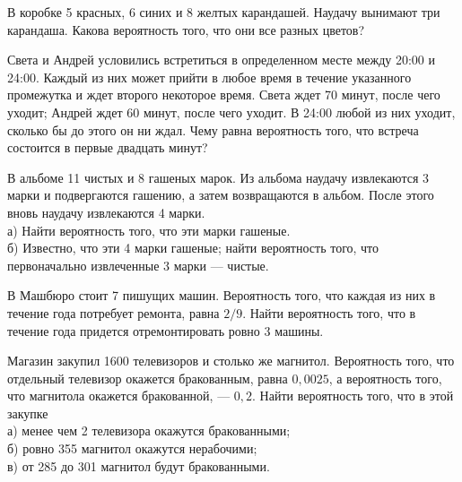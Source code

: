 \newpage\setcounter{zad}{0}



\begin{zkrW}{20}\noindent 
	В коробке 5 красных, 6 синих и 8 желтых карандашей. Наудачу вынимают три карандаша. Какова вероятность того, что они все разных цветов?
 
\end{zkrW}

\begin{zkrW}{20}\noindent 
	Света и Андрей условились встретиться в определенном месте между 20:00 и 24:00. Каждый из них может прийти в любое время в течение указанного промежутка и ждет второго некоторое время. Света ждет 70 минут, после чего уходит; Андрей ждет 60 минут, после чего уходит. В 24:00 любой из них уходит, сколько бы до этого он ни ждал. Чему равна вероятность того, что встреча состоится в первые двадцать минут?
 
\end{zkrW}

\begin{zkrW}{20}\noindent 
	В альбоме 11 чистых и 8 гашеных марок. Из альбома наудачу извлекаются 3 марки и подвергаются гашению, а затем возвращаются в альбом. После этого вновь наудачу извлекаются 4 марки. \\ \indent а) Найти вероятность того, что эти марки гашеные. \\ \indent б) Известно, что эти 4 марки гашеные; найти вероятность того, что первоначально извлеченные 3 марки --- чистые.
 
\end{zkrW}

\begin{zkrW}{20}\noindent 
	В Машбюро стоит 7 пишущих машин. Вероятность того, что каждая из них в течение года потребует ремонта, равна $2/9$. Найти вероятность того, что в течение года придется отремонтировать ровно 3 машины.
 
\end{zkrW}

\begin{zkrW}{20}\noindent 
	Магазин закупил 1600 телевизоров и столько же магнитол. Вероятность того, что отдельный телевизор окажется бракованным, равна $0{,}0025$, а вероятность того, что магнитола окажется бракованной, --- $0{,}2$. Найти вероятность того, что в этой закупке \\ \indent а) менее чем 2 телевизора окажутся бракованными; \\ \indent б) ровно 355 магнитол окажутся нерабочими; \\ \indent в) от 285 до 301 магнитол будут бракованными.
 
\end{zkrW}

